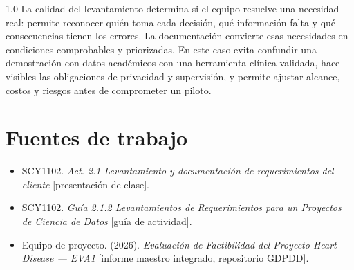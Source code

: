 \documentclass[12pt,a4paper]{article}
\begin{document}
\begin{spacing}{1.0}
La calidad del levantamiento determina si el equipo resuelve una necesidad real: permite reconocer quién toma cada decisión, qué información falta y qué consecuencias tienen los errores. La documentación convierte esas necesidades en condiciones comprobables y priorizadas. En este caso evita confundir una demostración con datos académicos con una herramienta clínica validada, hace visibles las obligaciones de privacidad y supervisión, y permite ajustar alcance, costos y riesgos antes de comprometer un piloto.

\section*{Fuentes de trabajo}
\begin{itemize}
  \item SCY1102. \emph{Act. 2.1 Levantamiento y documentación de requerimientos del cliente} [presentación de clase].
  \item SCY1102. \emph{Guía 2.1.2 Levantamientos de Requerimientos para un Proyectos de Ciencia de Datos} [guía de actividad].
  \item Equipo de proyecto. (2026). \emph{Evaluación de Factibilidad del Proyecto Heart Disease --- EVA1} [informe maestro integrado, repositorio GDPDD].
\end{itemize}
\end{spacing}
\end{document}
